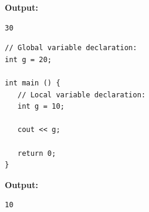 \textbf{Output:}
\begin{verbatim}
30
\end{verbatim}

\begin{verbatim}
// Global variable declaration:
int g = 20;
 
int main () {
   // Local variable declaration:
   int g = 10;
 
   cout << g;
 
   return 0;
}
\end{verbatim}

\textbf{Output:}
\begin{verbatim}
10
\end{verbatim}